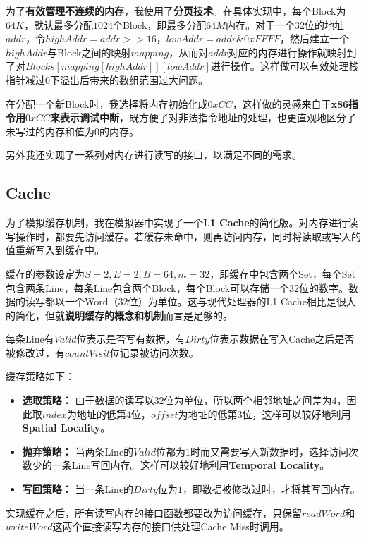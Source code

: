 为了{\bf 有效管理不连续的内存}，我使用了{\bf 分页技术}。在具体实现中，每个Block为$64K$，默认最多分配$1024$个Block，即最多分配$64M$内存。对于一个$32$位的地址$addr$，令$highAddr = addr >> 16$，$lowAddr = addr \& 0xFFFF$，然后建立一个$highAddr$与Block之间的映射$mapping$，从而对$addr$对应的内存进行操作就映射到了对$Blocks[mapping[highAddr]][lowAddr]$进行操作。这样做可以有效处理栈指针减过$0$下溢出后带来的数组范围过大问题。

在分配一个新Block时，我选择将内存初始化成$0xCC$，这样做的灵感来自于{\bf x86指令用$0xCC$来表示调试中断}，既方便了对非法指令地址的处理，也更直观地区分了未写过的内存和值为$0$的内存。

另外我还实现了一系列对内存进行读写的接口，以满足不同的需求。

\subsection{Cache}

为了模拟缓存机制，我在模拟器中实现了一个{\bf L1 Cache}的简化版。对内存进行读写操作时，都要先访问缓存。若缓存未命中，则再访问内存，同时将读取或写入的值重新写入到缓存中。

缓存的参数设定为$S = 2, E = 2, B = 64, m = 32$，即缓存中包含两个Set，每个Set包含两条Line，每条Line包含两个Block，每个Block可以存储一个$32$位的数字。数据的读写都以一个Word（$32$位）为单位。这与现代处理器的L1 Cache相比是很大的简化，但就{\bf 说明缓存的概念和机制}而言是足够的。

每条Line有$Valid$位表示是否写有数据，有$Dirty$位表示数据在写入Cache之后是否被修改过，有$countVisit$位记录被访问次数。

缓存策略如下：

\begin{itemize}
\item {\bf 选取策略：} 由于数据的读写以$32$位为单位，所以两个相邻地址之间差为$4$，因此取$index$为地址的低第$4$位，$offset$为地址的低第$3$位，这样可以较好地利用{\bf Spatial Locality}。
\item {\bf 抛弃策略：} 当两条Line的$Valid$位都为$1$时而又需要写入新数据时，选择访问次数少的一条Line写回内存。这样可以较好地利用{\bf Temporal Locality}。
\item {\bf 写回策略：} 当一条Line的$Dirty$位为$1$，即数据被修改过时，才将其写回内存。
\end{itemize}

实现缓存之后，所有读写内存的接口函数都要改为访问缓存，只保留$readWord$和$writeWord$这两个直接读写内存的接口供处理Cache Miss时调用。

